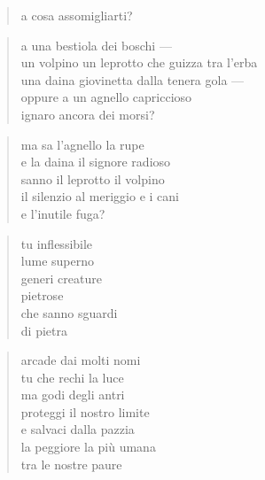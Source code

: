 \clearpage


\begin{verse}
    a cosa assomigliarti?
\end{verse}

\begin{verse}
    a una bestiola dei boschi —\\
    un volpino un leprotto che guizza tra l'erba\\
    una daina giovinetta dalla tenera gola —\\
    oppure a un agnello capriccioso\\
    ignaro ancora dei morsi?
\end{verse}

\begin{verse}
    ma sa l'agnello la rupe\\
    e la daina il signore radioso\\
    sanno il leprotto il volpino\\
    il silenzio al meriggio e i cani\\
    e l'inutile fuga?
\end{verse}

\clearpage


\begin{verse}
    tu inflessibile\\
    lume superno\\
    generi creature\\
    pietrose\\
    che sanno sguardi\\
    di pietra
\end{verse}

\clearpage


\begin{verse}
    arcade dai molti nomi\\
    tu che rechi la luce\\
    ma godi degli antri\\
    proteggi il nostro limite\\
    e salvaci dalla pazzia\\
    la peggiore la più umana\\
    tra le nostre paure
\end{verse}
